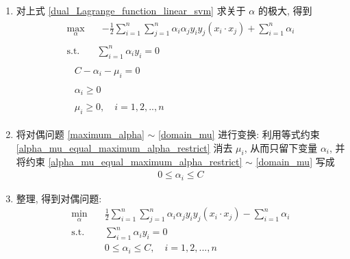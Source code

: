 \documentclass[oneside, 12pt]{ctexbook}
\begin{document}
\begin{enumerate}
					\item 对上式 \ref{dual_Lagrange_function_linear_svm} 求关于 $\alpha$ 的极大, 得到
						\begin{align}
							\begin{split}
								\max\limits_{\alpha} \quad &- \frac{1}{2}\sum_{i=1}^{n}\sum_{j=1}^{n} \alpha_i\alpha_j y_i y_j (x_i \cdot x_j) + \sum_{i=1}^{n}\alpha_i 
							\end{split} \label{maximum_alpha}
							\\
							\begin{split}
								\text{s.t.} \quad &\sum_{i=1}^{n} \alpha_i y_i = 0 \label{alpha_equal_maximum_alpha_restrict}
							\end{split}
							 \\
							\begin{split}
								&C -\alpha_i -\mu_i = 0 \label{alpha_mu_equal_maximum_alpha_restrict}
							\end{split}
							 \\
							\begin{split}
								&\alpha_i \geq 0 \label{domain_alpha}
							\end{split}
							\\
							\begin{split}
								&\mu_i \geq 0, \quad i=1,2,..,n \label{domain_mu}
							\end{split}	
						\end{align}
						
					\item 将对偶问题 \ref{maximum_alpha} $\sim$ \ref{domain_mu} 进行变换: 利用等式约束 \ref{alpha_mu_equal_maximum_alpha_restrict} 消去 $\mu_i$, 从而只留下变量 $\alpha_i$, 并将约束 \ref{alpha_mu_equal_maximum_alpha_restrict} $\sim$ \ref{domain_mu} 写成
						\begin{align}
							0 \leq \alpha_i \leq C
						\end{align}
						
					\item 整理, 得到对偶问题:
						\begin{align}
							\min\limits_{\alpha} \quad & \frac{1}{2}\sum_{i=1}^{n}\sum_{j=1}^{n} \alpha_i\alpha_j y_i y_j (x_i \cdot x_j) - \sum_{i=1}^{n}\alpha_i \\
							\text{s.t.} \quad &\sum_{i=1}^{n} \alpha_i y_i = 0\\
							&0 \leq \alpha_i \leq C, \quad i=1,2,...,n
						\end{align}
				\end{enumerate}
			
\end{document}
